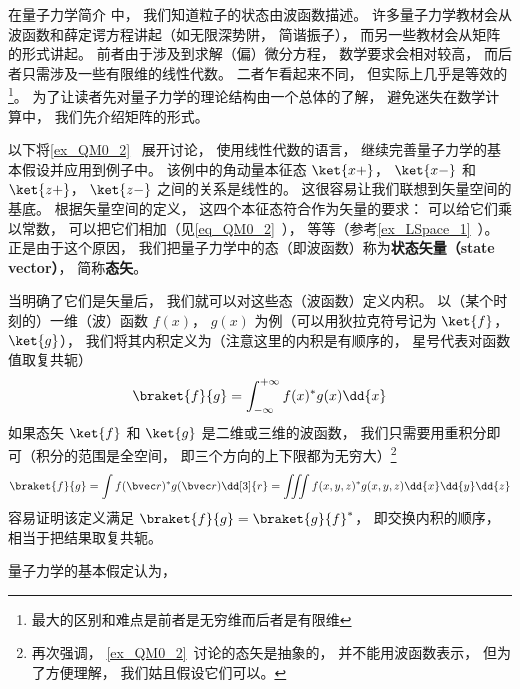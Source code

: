 

在量子力学简介 中， 我们知道粒子的状态由波函数描述。 许多量子力学教材会从波函数和薛定谔方程讲起（如无限深势阱， 简谐振子）， 而另一些教材会从矩阵的形式讲起。 前者由于涉及到求解（偏）微分方程， 数学要求会相对较高， 而后者只需涉及一些有限维的线性代数。 二者乍看起来不同， 但实际上几乎是等效的\footnote{最大的区别和难点是前者是无穷维而后者是有限维}。 为了让读者先对量子力学的理论结构由一个总体的了解， 避免迷失在数学计算中， 我们先介绍矩阵的形式。

以下将\autoref{ex_QM0_2}~ 展开讨论， 使用线性代数的语言， 继续完善量子力学的基本假设并应用到例子中。 该例中的角动量本征态 $\ket{x+}$， $\ket{x-}$ 和 $\ket{z+}$， $\ket{z-}$ 之间的关系是线性的。 这很容易让我们联想到矢量空间的基底。 根据矢量空间的定义， 这四个本征态符合作为矢量的要求： 可以给它们乘以常数， 可以把它们相加（见\autoref{eq_QM0_2}~）， 等等（参考\autoref{ex_LSpace_1}~）。 正是由于这个原因， 我们把量子力学中的态（即波函数）称为\textbf{状态矢量（state vector）}， 简称\textbf{态矢}。

当明确了它们是矢量后， 我们就可以对这些态（波函数）定义内积。 以（某个时刻的）一维（波）函数 $f(x)$， $g(x)$ 为例（可以用狄拉克符号记为 $\ket{f}$， $\ket{g}$）， 我们将其内积定义为（注意这里的内积是有顺序的， 星号代表对函数值取复共轭）%
\begin{equation}
\braket{f}{g} = \int_{-\infty}^{+\infty} f(x)^* g(x) \dd{x}
\end{equation}
如果态矢 $\ket{f}$ 和 $\ket{g}$ 是二维或三维的波函数， 我们只需要用重积分即可（积分的范围是全空间， 即三个方向的上下限都为无穷大）\footnote{再次强调， \autoref{ex_QM0_2}~讨论的态矢是抽象的， 并不能用波函数表示， 但为了方便理解， 我们姑且假设它们可以。}
\begin{equation}
\braket{f}{g} = \int f(\bvec r)^* g(\bvec r) \dd[3]{r} = \iiint f(x, y, z)^* g(x, y, z) \dd{x}\dd{y}\dd{z}
\end{equation}
容易证明该定义满足 $\braket{f}{g} = \braket{g}{f}^*$， 即交换内积的顺序， 相当于把结果取复共轭。


量子力学的基本假定认为，




